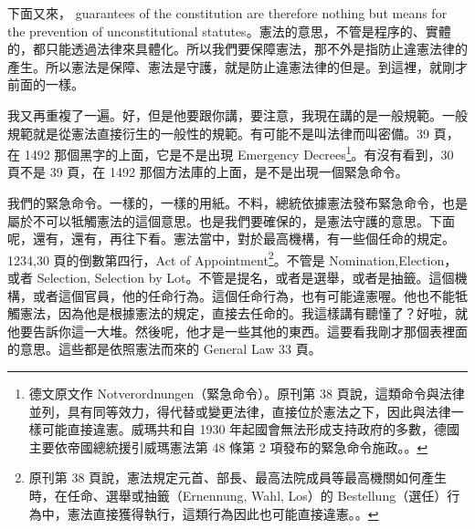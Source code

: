 \hypertarget{w05:cue:114}{}下面又來，
\hypertarget{w05:cue:115}{}guarantees of the constitution are therefore nothing but means for the prevention of unconstitutional statutes。憲法的意思，不管是程序的、實體的，都只能透過法律來具體化。所以我們要保障憲法，那不外是指防止違憲法律的產生。所以憲法是保障、憲法是守護，就是防止違憲法律的但是。到這裡，就剛才前面的一樣。

\hypertarget{w05:cue:116}{}我又再重複了一遍。好，但是他要跟你講，要注意，我現在講的是一般規範。一般規範就是從憲法直接衍生的一般性的規範。有可能不是叫法律而叫密備。39 頁，在 1492 那個黑字的上面，它是不是出現 Emergency Decrees\footnote{德文原文作 Notverordnungen（緊急命令）。原刊第 38 頁說，這類命令與法律並列，具有同等效力，得代替或變更法律，直接位於憲法之下，因此與法律一樣可能直接違憲。威瑪共和自 1930 年起國會無法形成支持政府的多數，德國主要依帝國總統援引威瑪憲法第 48 條第 2 項發布的緊急命令施政。\cite[38]{kelsen1929}。}。有沒有看到，30 頁不是 39 頁，在 1492 那個方法庫的上面，是不是出現一個緊急命令。

\hypertarget{w05:cue:117}{}我們的緊急命令。一樣的，一樣的用紙。不料，總統依據憲法發布緊急命令，也是屬於不可以牴觸憲法的這個意思。也是我們要確保的，是憲法守護的意思。下面呢，還有，還有，再往下看。憲法當中，對於最高機構，有一些個任命的規定。1234,30 頁的倒數第四行，Act of Appointment\footnote{原刊第 38 頁說，憲法規定元首、部長、最高法院成員等最高機關如何產生時，在任命、選舉或抽籤（Ernennung, Wahl, Los）的 Bestellung（選任）行為中，憲法直接獲得執行，這類行為因此也可能直接違憲。\cite[38]{kelsen1929}。}。不管是 Nomination,Election，或者 Selection,
\hypertarget{w05:cue:118}{}Selection by Lot。不管是提名，或者是選舉，或者是抽籤。這個機構，或者這個官員，他的任命行為。這個任命行為，也有可能違憲喔。他也不能牴觸憲法，因為他是根據憲法的規定，直接去任命的。我這樣講有聽懂了？好啦，就他要告訴你這一大堆。然後呢，他才是一些其他的東西。這要看我剛才那個表裡面的意思。這些都是依照憲法而來的 General Law 33 頁。

